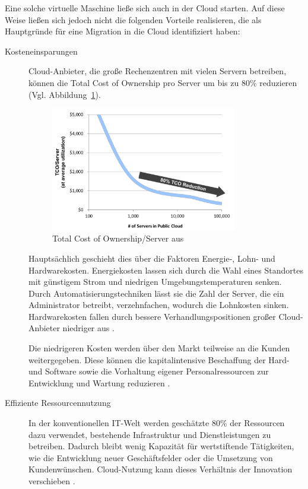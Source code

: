 Eine solche virtuelle Maschine ließe sich auch in der Cloud starten. Auf diese 
Weise ließen sich jedoch nicht die folgenden Vorteile realisieren, die 
 als Hauptgründe für eine Migration in die 
Cloud identifiziert haben:
\begin{description}
	\item[Kosteneinsparungen] Cloud-Anbieter, die große Rechenzentren
mit vielen Servern betreiben, können die Total Cost of Ownership pro Server um
bis zu 80\% reduzieren (Vgl. Abbildung~\ref{fig:tco_reduction}).

\begin{figure}[!h]
\begin{center}
\includegraphics[width=0.8\textwidth]{images/tco_reduction.png}
\caption{Total Cost of Ownership/Server
aus \protect{}}
\label{fig:tco_reduction}
\end{center}
\end{figure}
 Hauptsächlich geschieht dies über die Faktoren Energie-, Lohn- und
Hardwarekosten. Energiekosten lassen sich durch die Wahl eines Standortes
mit günstigem Strom und niedrigen Umgebungstemperaturen senken. Durch
Automatisierungstechniken lässt sie die Zahl der Server, die ein Administrator
betreibt, verzehnfachen, wodurch die Lohnkosten sinken. Hardwarekosten fallen
durch bessere Verhandlungspositionen großer Cloud-Anbieter niedriger aus 
.

Die niedrigeren Kosten werden über den Markt teilweise an die Kunden weitergegeben. Diese
können die kapitalintensive Beschaffung der Hard- und Software sowie die
Vorhaltung eigener Personalressourcen zur Entwicklung und Wartung reduzieren .

	\item[Effiziente Ressourcennutzung] In der konventionellen IT-Welt
werden geschätzte 80\% der Ressourcen dazu verwendet, bestehende Infrastruktur
und Dienstleistungen zu betreiben. Dadurch bleibt wenig Kapazität für wertstiftende
Tätigkeiten, wie die Entwicklung neuer Geschäftsfelder oder die Umsetzung von
Kundenwünschen. Cloud-Nutzung kann
dieses Verhältnis der Innovation verschieben .


\end{description}
